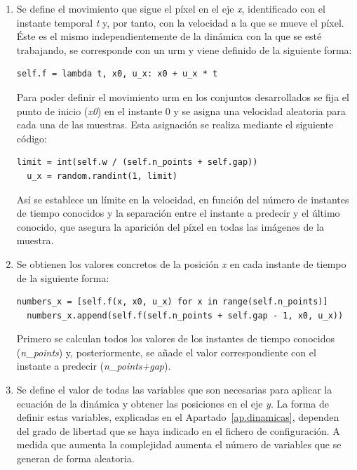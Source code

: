 \begin{enumerate}
  \item Se define el movimiento que sigue el píxel en el eje \textit{x}, identificado con el instante temporal \textit{t} y, por tanto, con la velocidad a la que se mueve el píxel. Éste es el mismo independientemente de la dinámica con la que se esté trabajando, se corresponde con un \acrshort{urm} y viene definido de la siguiente forma:
  \vspace{10pt}
  \begin{lstlisting}[frame=single]
  self.f = lambda t, x0, u_x: x0 + u_x * t
  \end{lstlisting}
  Para poder definir el movimiento \acrshort{urm} en los conjuntos desarrollados se fija el punto de inicio (\textit{x0}) en el instante 0 y se asigna una velocidad aleatoria para cada una de las muestras. Esta asignación se realiza mediante el siguiente código:
  \vspace{10pt}
  \begin{lstlisting}[frame=single]
  limit = int(self.w / (self.n_points + self.gap))
  u_x = random.randint(1, limit)
  \end{lstlisting}
  Así se establece un límite en la velocidad, en función del número de instantes de tiempo conocidos y la separación entre el instante a predecir y el último conocido, que asegura la aparición del píxel en todas las imágenes de la muestra.
  
  \item Se obtienen los valores concretos de la posición \textit{x} en cada instante de tiempo de la siguiente forma:
  \vspace{10pt}
  \begin{lstlisting}[frame=single]
  numbers_x = [self.f(x, x0, u_x) for x in range(self.n_points)]
  numbers_x.append(self.f(self.n_points + self.gap - 1, x0, u_x))
  \end{lstlisting}
  Primero se calculan todos los valores de los instantes de tiempo conocidos (\textit{n}\_\textit{points}) y, posteriormente, se añade el valor correspondiente con el instante a predecir (\textit{n}\_\textit{points+gap}).
  
  \item Se define el valor de todas las variables que son necesarias para aplicar la ecuación de la dinámica y obtener las posiciones en el eje \textit{y}. La forma de definir estas variables, explicadas en el Apartado~\ref{ap.dinamicas}, dependen del grado de libertad que se haya indicado en el fichero de configuración. A medida que aumenta la complejidad aumenta el número de variables que se generan de forma aleatoria. 
  

\end{enumerate}
